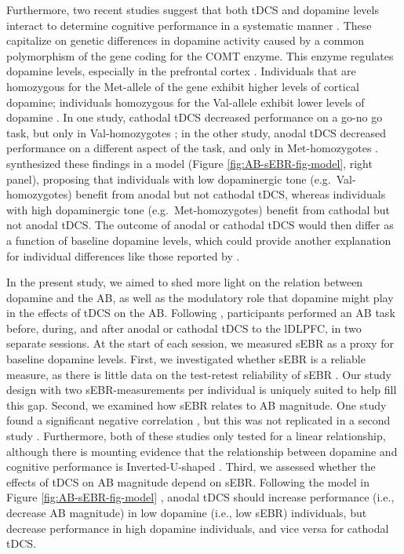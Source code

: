 \documentclass[11pt,]{memoir}
\begin{document}
Furthermore, two recent studies suggest that both tDCS and dopamine levels interact to determine cognitive performance in a systematic manner \autocite{Wiegand2016}. These capitalize on genetic differences in dopamine activity caused by a common polymorphism of the gene coding for the COMT enzyme. This enzyme regulates dopamine levels, especially in the prefrontal cortex \autocite{Kaenmaki2010}. Individuals that are homozygous for the Met-allele of the gene exhibit higher levels of cortical dopamine; individuals homozygous for the Val-allele exhibit lower levels of dopamine \autocite{Schacht2016}. In one study, cathodal tDCS decreased performance on a go-no go task, but only in Val-homozygotes \autocite{Nieratschker2015}; in the other study, anodal tDCS decreased performance on a different aspect of the task, and only in Met-homozygotes \autocite{Plewnia2013}. \textcite{Wiegand2016} synthesized these findings in a model (Figure \ref{fig:AB-sEBR-fig-model}, right panel), proposing that individuals with low dopaminergic tone (e.g.~Val-homozygotes) benefit from anodal but not cathodal tDCS, whereas individuals with high dopaminergic tone (e.g.~Met-homozygotes) benefit from cathodal but not anodal tDCS. The outcome of anodal or cathodal tDCS would then differ as a function of baseline dopamine levels, which could provide another explanation for individual differences like those reported by \textcite{London2015}.

In the present study, we aimed to shed more light on the relation between dopamine and the AB, as well as the modulatory role that dopamine might play in the effects of tDCS on the AB. Following \textcite{London2015}, participants performed an AB task before, during, and after anodal or cathodal tDCS to the lDLPFC, in two separate sessions. At the start of each session, we measured sEBR as a proxy for baseline dopamine levels. First, we investigated whether sEBR is a reliable measure, as there is little data on the test-retest reliability of sEBR \autocite{Jongkees2016}. Our study design with two sEBR-measurements per individual is uniquely suited to help fill this gap. Second, we examined how sEBR relates to AB magnitude. One study found a significant negative correlation \autocite{Colzato2008}, but this was not replicated in a second study \autocite{Slagter2013}. Furthermore, both of these studies only tested for a linear relationship, although there is mounting evidence that the relationship between dopamine and cognitive performance is Inverted-U-shaped \autocite{Cools2011}. Third, we assessed whether the effects of tDCS on AB magnitude depend on sEBR. Following the model in Figure \ref{fig:AB-sEBR-fig-model} \autocites{Krause2013}{London2015}{Wiegand2016}, anodal tDCS should increase performance (i.e., decrease AB magnitude) in low dopamine (i.e., low sEBR) individuals, but decrease performance in high dopamine individuals, and vice versa for cathodal tDCS.
\end{document}
